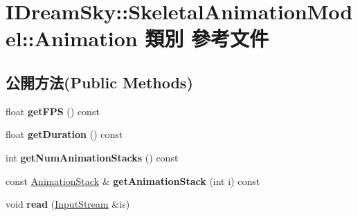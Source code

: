\hypertarget{class_i_dream_sky_1_1_skeletal_animation_model_1_1_animation}{}\section{I\+Dream\+Sky\+:\+:Skeletal\+Animation\+Model\+:\+:Animation 類別 參考文件}
\label{class_i_dream_sky_1_1_skeletal_animation_model_1_1_animation}
\subsection*{公開方法(Public Methods)}
\begin{DoxyCompactItemize}
\item 
float {\bfseries get\+F\+PS} () const \hypertarget{class_i_dream_sky_1_1_skeletal_animation_model_1_1_animation_ab91ec1a56710df4c0127a411cff4a189}{}\label{class_i_dream_sky_1_1_skeletal_animation_model_1_1_animation_ab91ec1a56710df4c0127a411cff4a189}

\item 
float {\bfseries get\+Duration} () const \hypertarget{class_i_dream_sky_1_1_skeletal_animation_model_1_1_animation_aa1ee2e6a4bb643743e45b52efd5b1805}{}\label{class_i_dream_sky_1_1_skeletal_animation_model_1_1_animation_aa1ee2e6a4bb643743e45b52efd5b1805}

\item 
int {\bfseries get\+Num\+Animation\+Stacks} () const \hypertarget{class_i_dream_sky_1_1_skeletal_animation_model_1_1_animation_ad1cd7b11a9ebcb402cac4fc423d11d2b}{}\label{class_i_dream_sky_1_1_skeletal_animation_model_1_1_animation_ad1cd7b11a9ebcb402cac4fc423d11d2b}

\item 
const \hyperlink{class_i_dream_sky_1_1_skeletal_animation_model_1_1_animation_stack}{Animation\+Stack} \& {\bfseries get\+Animation\+Stack} (int i) const \hypertarget{class_i_dream_sky_1_1_skeletal_animation_model_1_1_animation_a7a272ff499849853304112b759415d41}{}\label{class_i_dream_sky_1_1_skeletal_animation_model_1_1_animation_a7a272ff499849853304112b759415d41}

\item 
void {\bfseries read} (\hyperlink{class_i_dream_sky_1_1_input_stream}{Input\+Stream} \&is)\hypertarget{class_i_dream_sky_1_1_skeletal_animation_model_1_1_animation_a83ed6a7ce68cf9d03f4b4e3178b869d5}{}\label{class_i_dream_sky_1_1_skeletal_animation_model_1_1_animation_a83ed6a7ce68cf9d03f4b4e3178b869d5}


\end{DoxyCompactItemize}
